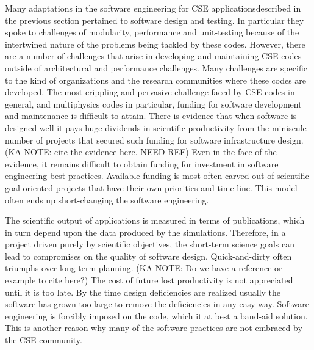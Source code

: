 
\label{sec:instChallenges}
Many adaptations in the software engineering for CSE applicationsdescribed in the previous
section pertained to software design and testing. In particular they
spoke to challenges of modularity, performance and unit-testing because of the
intertwined nature of the problems being tackled by these
codes. However, there are a number of challenges that arise in developing and maintaining CSE codes outside of architectural and performance challenges.  Many challenges are specific to the kind of organizations and the research communities
where these codes are developed. The most crippling and pervasive
challenge faced by CSE codes in general, and multiphysics codes in
particular, funding for software development and maintenance is difficult to attain. 
There is evidence that when software is designed well
it pays huge dividends in scientific productivity from the
miniscule number of projects that secured such funding for software
infrastructure design. (KA NOTE: cite the evidence here. NEED REF) Even in the face of the evidence, it remains difficult to obtain funding for investment in software engineering best practices.  Available funding is most often carved out of scientific goal
oriented projects that have their own priorities and time-line. This
model often ends up short-changing the software engineering.


The scientific output of applications is measured in terms of publications, which in
turn depend upon the data produced by the simulations. Therefore, in a
project driven purely by scientific objectives, the short-term science
goals can lead to compromises on the quality of software
design. Quick-and-dirty often triumphs over long term planning.  (KA NOTE: Do we have a reference or example to cite here?)
The cost of future lost productivity is not appreciated until it is too
late. By the time design deficiencies are realized usually the
software has grown too large to remove the deficiencies in any easy
way.  Software engineering is forcibly imposed on the code, which it
at best a band-aid solution. This is another reason why many of the
software practices are not embraced by the CSE community. 

